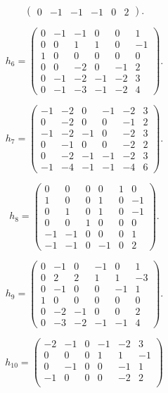 \begin{description}
\[\begin{pmatrix}
0 & -1 & -1 & -1 & 0 & 2
\end{pmatrix}.
\]
\item[$h_{6}$] 
\[
h_{6}=\begin{pmatrix}
0 & -1 & -1 & 0 & 0 & 1 \\
0 & 0 & 1 & 1 & 0 & -1 \\
1 & 0 & 0 & 0 & 0 & 0 \\
0 & 0 & -2 & 0 & -1 & 2 \\
0 & -1 & -2 & -1 & -2 & 3 \\
0 & -1 & -3 & -1 & -2 & 4
\end{pmatrix}.
\]
\item[$h_{7}$] 
\[
h_{7}=\begin{pmatrix}
-1 & -2 & 0 & -1 & -2 & 3 \\
0 & -2 & 0 & 0 & -1 & 2 \\
-1 & -2 & -1 & 0 & -2 & 3 \\
0 & -1 & 0 & 0 & -2 & 2 \\
0 & -2 & -1 & -1 & -2 & 3 \\
-1 & -4 & -1 & -1 & -4 & 6
\end{pmatrix}.
\]
\item[$h_{8}$] 
\[
h_{8}=\begin{pmatrix}
0 & 0 & 0 & 0 & 1 & 0 \\
1 & 0 & 0 & 1 & 0 & -1 \\
0 & 1 & 0 & 1 & 0 & -1 \\
0 & 0 & 1 & 0 & 0 & 0 \\
-1 & -1 & 0 & 0 & 0 & 1 \\
-1 & -1 & 0 & -1 & 0 & 2
\end{pmatrix}.
\]
\item[$h_{9}$] 
\[
h_{9}=\begin{pmatrix}
0 & -1 & 0 & -1 & 0 & 1 \\
0 & 2 & 2 & 1 & 1 & -3 \\
0 & -1 & 0 & 0 & -1 & 1 \\
1 & 0 & 0 & 0 & 0 & 0 \\
0 & -2 & -1 & 0 & 0 & 2 \\
0 & -3 & -2 & -1 & -1 & 4
\end{pmatrix}.
\]
\item[$h_{10}$] 
\[
h_{10}=\begin{pmatrix}
-2 & -1 & 0 & -1 & -2 & 3 \\
0 & 0 & 0 & 1 & 1 & -1 \\
0 & -1 & 0 & 0 & -1 & 1 \\
-1 & 0 & 0 & 0 & -2 & 2 \\

\end{pmatrix}\]
\end{description}
